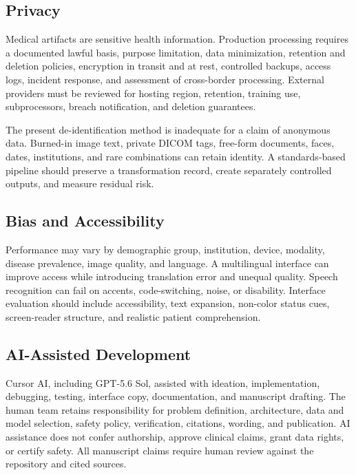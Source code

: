 \documentclass[conference]{IEEEtran}
\begin{document}
\subsection{Privacy}

Medical artifacts are sensitive health information. Production processing requires a documented lawful basis, purpose limitation, data minimization, retention and deletion policies, encryption in transit and at rest, controlled backups, access logs, incident response, and assessment of cross-border processing. External providers must be reviewed for hosting region, retention, training use, subprocessors, breach notification, and deletion guarantees.

The present de-identification method is inadequate for a claim of anonymous data. Burned-in image text, private DICOM tags, free-form documents, faces, dates, institutions, and rare combinations can retain identity. A standards-based pipeline should preserve a transformation record, create separately controlled outputs, and measure residual risk.

\subsection{Bias and Accessibility}

Performance may vary by demographic group, institution, device, modality, disease prevalence, image quality, and language. A multilingual interface can improve access while introducing translation error and unequal quality. Speech recognition can fail on accents, code-switching, noise, or disability. Interface evaluation should include accessibility, text expansion, non-color status cues, screen-reader structure, and realistic patient comprehension.

\subsection{AI-Assisted Development}

Cursor AI, including GPT-5.6 Sol, assisted with ideation, implementation, debugging, testing, interface copy, documentation, and manuscript drafting. The human team retains responsibility for problem definition, architecture, data and model selection, safety policy, verification, citations, wording, and publication. AI assistance does not confer authorship, approve clinical claims, grant data rights, or certify safety. All manuscript claims require human review against the repository and cited sources.
\end{document}
